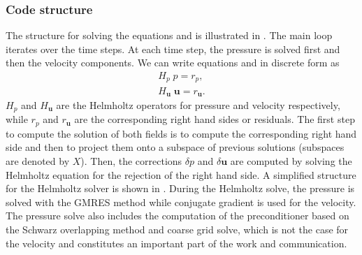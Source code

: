 \documentclass{sig-alternate}
\begin{document}
\subsubsection{Code structure}
\label{sec:code}

The structure for solving the equations  and  is illustrated in . The main loop iterates over the time steps. At each time step, the pressure is solved first and then the velocity components. We can write equations  and  in discrete form as 
\begin{align}
H_p \; p = r_p, \\
H_{\mathbf{u}} \; \mathbf{u} = r_{\mathbf{u}}.
\end{align}
$H_p$ and $H_{\mathbf{u}}$ are the Helmholtz operators for pressure and velocity respectively, while $r_p$ and $r_{\mathbf{u}}$ are the corresponding right hand sides or residuals. The first step to compute the solution of both fields is to compute the corresponding right hand side and then to project them onto a subspace of previous solutions (subspaces are denoted by $X$). Then, the corrections $\delta p$ and $\delta \mathbf{u}$ are computed by solving the Helmholtz equation for the rejection of the right hand side. A simplified structure for the Helmholtz solver is shown in . During the Helmholtz solve, the pressure is solved with the GMRES method while conjugate gradient is used for the velocity. The pressure solve also includes the computation of the preconditioner based on the Schwarz overlapping method and coarse grid solve, which is not the case for the velocity and constitutes an important part of the work and communication.
\end{document}
